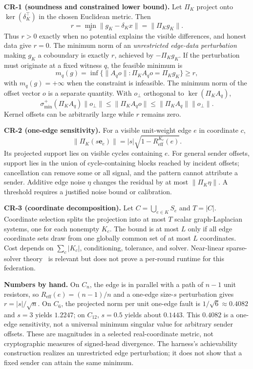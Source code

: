 \documentclass[11pt,a4paper]{article}
\begin{document}
\begin{thebox}
\textbf{CR-1 (soundness and constrained lower bound).} Let $\Pi_K$ project onto $\ker(\delta_K^{\!\top})$ in the chosen Euclidean metric. Then
\[
r=\min_x\|g_K-\delta_Kx\|=\|\Pi_Kg_K\|.
\]
Thus $r>0$ exactly when no potential explains the visible differences, and honest data give $r=0$. The minimum norm of an \emph{unrestricted edge-data perturbation} making $g_K$ a coboundary is exactly $r$, achieved by $-\Pi_Kg_K$. If the perturbation must originate at a fixed witness $q$, the feasible minimum is
\[
m_q(g)=\inf\{\|A_qo\|:\Pi_KA_qo=\Pi_Kg_K\}\ge r,
\]
with $m_q(g)=+\infty$ when the constraint is infeasible. The minimum norm of the offset vector $o$ is a separate quantity. With $o_\perp$ orthogonal to $\ker(\Pi_KA_q)$,
\[
\sigma_{\min}^{+}(\Pi_KA_q)\|o_\perp\|
\le \|\Pi_KA_qo\|\le\|\Pi_KA_q\|\|o_\perp\|.
\]
Kernel offsets can be arbitrarily large while $r$ remains zero.

\textbf{CR-2 (one-edge sensitivity).} For a visible unit-weight edge $e$ in coordinate $c$,
\[
\|\Pi_K(s\mathbf e_e)\|=|s|\sqrt{1-R_{\mathrm{eff}}^{K_c}(e)}.
\]
Its projected support lies on visible cycles containing $e$. For general sender offsets, support lies in the union of cycle-containing blocks reached by incident offsets; cancellation can remove some or all signal, and the pattern cannot attribute a sender. Additive edge noise $\eta$ changes the residual by at most $\|\Pi_K\eta\|$. A threshold requires a justified noise bound or calibration.

\textbf{CR-3 (coordinate decomposition).} Let $C=\bigcup_{e\in K}S_e$ and $T=|C|$. Coordinate selection splits the projection into at most $T$ scalar graph-Laplacian systems, one for each nonempty $K_c$. The bound is at most $L$ only if all edge coordinate sets draw from one globally common set of at most $L$ coordinates. Cost depends on $\sum_c|K_c|$, conditioning, tolerance, and solver. Near-linear sparse-solver theory~\cite{spielman-teng} is relevant but does not prove a per-round runtime for this federation.
\end{thebox}

\textbf{Numbers by hand.} On $C_n$, the edge is in parallel with a path of $n-1$ unit resistors, so $R_{\mathrm{eff}}(e)=(n-1)/n$ and a one-edge size-$s$ perturbation gives $r=|s|/\sqrt n$. On $C_6$, the projected norm per unit one-edge fault is $1/\sqrt6\approx0.4082$ and $s=3$ yields $1.2247$; on $C_{12}$, $s=0.5$ yields about $0.1443$. This $0.4082$ is a one-edge sensitivity, not a universal minimum singular value for arbitrary sender offsets. These are magnitudes in a selected real-coordinate metric, not cryptographic measures of signed-head divergence. The harness's achievability construction realizes an unrestricted edge perturbation; it does not show that a fixed sender can attain the same minimum.
\end{document}
